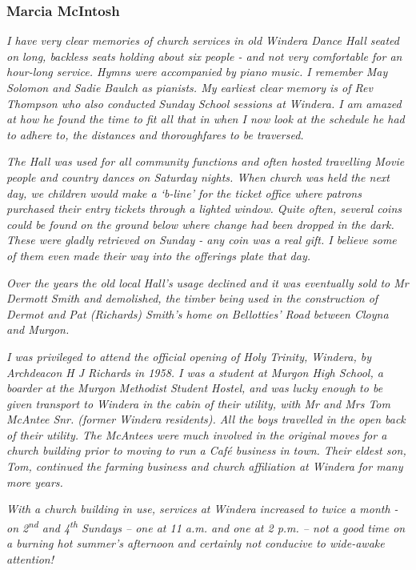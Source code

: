 \hypertarget{marcia-mcintosh}{%
\subsubsection{Marcia McIntosh}\label{marcia-mcintosh}}

\emph{I have very clear memories of church services in old Windera Dance Hall seated on long, backless seats holding about six people - and not very comfortable for an hour-long service. Hymns were accompanied by piano music. I remember May Solomon and Sadie Baulch as pianists. My earliest clear memory is of Rev Thompson who also conducted Sunday School sessions at Windera. I am amazed at how he found the time to fit all that in when I now look at the schedule he had to adhere to, the distances and thoroughfares to be traversed.}

\emph{The Hall was used for all community functions and often hosted travelling Movie people and country dances on Saturday nights. When church was held the next day, we children would make a `b-line' for the ticket office where patrons purchased their entry tickets through a lighted window. Quite often, several coins could be found on the ground below where change had been dropped in the dark. These were gladly retrieved on Sunday - any coin was a real gift. I believe some of them even made their way into the offerings plate that day.}

\emph{Over the years the old local Hall's usage declined and it was eventually sold to Mr Dermott Smith and demolished, the timber being used in the construction of Dermot and Pat (Richards) Smith's home on Bellotties' Road between Cloyna and Murgon.}

\emph{I was privileged to attend the official opening of Holy Trinity, Windera, by Archdeacon H J Richards in 1958. I was a student at Murgon High School, a boarder at the Murgon Methodist Student Hostel, and was lucky enough to be given transport to Windera in the cabin of their utility, with Mr and Mrs Tom McAntee Snr. (former Windera residents). All the boys travelled in the open back of their utility. The McAntees were much involved in the original moves for a church building prior to moving to run a Café business in town. Their eldest son, Tom, continued the farming business and church affiliation at Windera for many more years.}

\emph{With a church building in use, services at Windera increased to twice a month - on 2\textsuperscript{nd} and 4\textsuperscript{th} Sundays -- one at 11 a.m. and one at 2 p.m. -- not a good time on a burning hot summer's afternoon and certainly not conducive to wide-awake attention!}

